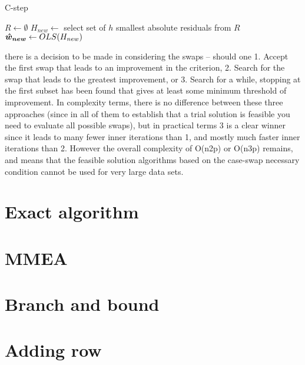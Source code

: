 \begin{algorithm}[H]
	\label{alg:Feasible solution}
	\caption{C-step}
	
	$R \gets \emptyset$\;
	$H_{new} \gets $ select set of $h$ smallest absolute residuals from $R$\;
	$\boldsymbol{\hat{w}_{new}} \gets OLS(H_{new})$\;
	\;
\end{algorithm}




there is a decision to be made in considering the swaps – should one
1. Accept the first swap that leads to an improvement in the criterion,
2. Search for the swap that leads to the greatest improvement, or
3. Search for a while, stopping at the first subset has been found that gives at least
some minimum threshold of improvement.
In complexity terms, there is no difference between these three approaches (since in
all of them to establish that a trial solution is feasible you need to evaluate all possible
swaps), but in practical terms 3 is a clear winner since it leads to many fewer inner
iterations than 1, and mostly much faster inner iterations than 2. However the overall
complexity of O(n2p) or O(n3p) remains, and means that the feasible solution algorithms
based on the case-swap necessary condition cannot be used for very large data sets.


\section{Exact algorithm}

\section{MMEA}
\section{Branch and bound}
\section{Adding row}
